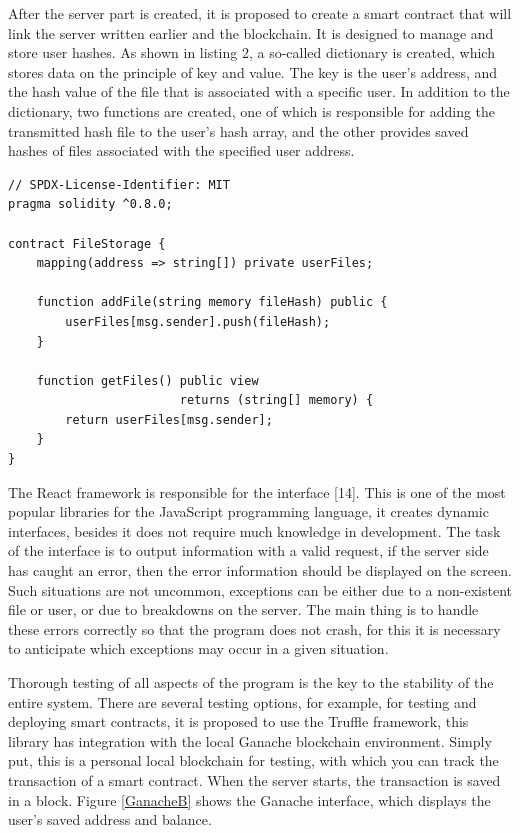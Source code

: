 \documentclass[10pt,conference,a4paper]{IEEEtran_EDM}
\begin{document}
After the server part is created, it is proposed to create a smart contract that will link the server written earlier and the blockchain. It is designed to manage and store user hashes. As shown in listing 2, a so-called dictionary is created, which stores data on the principle of key and value. The key is the user's address, and the hash value of the file that is associated with a specific user. In addition to the dictionary, two functions are created, one of which is responsible for adding the transmitted hash file to the user's hash array, and the other provides saved hashes of files associated with the specified user address.


\begin{lstlisting}[caption=Solidity code for a smart contract]
// SPDX-License-Identifier: MIT
pragma solidity ^0.8.0;

contract FileStorage {
    mapping(address => string[]) private userFiles;

    function addFile(string memory fileHash) public {
        userFiles[msg.sender].push(fileHash);
    }

    function getFiles() public view
                        returns (string[] memory) {
        return userFiles[msg.sender];
    }
}
\end{lstlisting}

The React framework is responsible for the interface [14]. This is one of the most popular libraries for the JavaScript programming language, it creates dynamic interfaces, besides it does not require much knowledge in development. The task of the interface is to output information with a valid request, if the server side has caught an error, then the error information should be displayed on the screen. Such situations are not uncommon, exceptions can be either due to a non-existent file or user, or due to breakdowns on the server. The main thing is to handle these errors correctly so that the program does not crash, for this it is necessary to anticipate which exceptions may occur in a given situation.

Thorough testing of all aspects of the program is the key to the stability of the entire system. There are several testing options, for example, for testing and deploying smart contracts, it is proposed to use the Truffle framework, this library has integration with the local Ganache blockchain environment. Simply put, this is a personal local blockchain for testing, with which you can track the transaction of a smart contract. When the server starts, the transaction is saved in a block. Figure \ref{GanacheB} shows the Ganache interface, which displays the user's saved address and balance.
\end{document}
